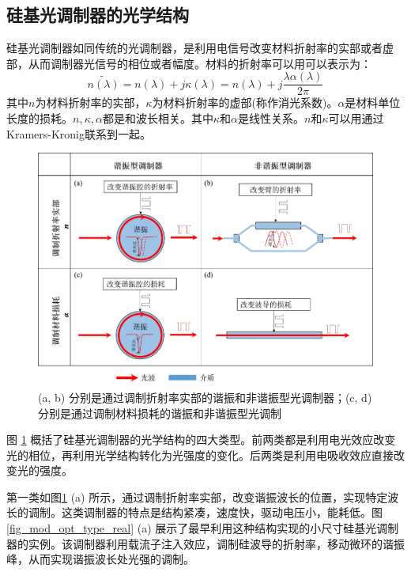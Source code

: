 \subsection{硅基光调制器的光学结构}
硅基光调制器如同传统的光调制器，是利用电信号改变材料折射率的实部或者虚部，从而调制器光信号的相位或者幅度。材料的折射率可以用可以表示为：
\begin{equation}
	\label{Equ:index}
	\widetilde{n(\lambda)} = n(\lambda) + j\kappa(\lambda) =  n(\lambda) + j\frac{\lambda\alpha(\lambda)}{2\pi}
\end{equation}
其中$n$为材料折射率的实部，$\kappa$为材料折射率的虚部(称作消光系数)。$\alpha$是材料单位长度的损耗。$n, \kappa, \alpha$都是和波长相关。其中$\kappa$和$\alpha$是线性关系。$n$和$\kappa$可以用通过Kramers-Kronig联系到一起\cite{o1981kramers}。

\begin{figure}[htb]
	\centering
	\includegraphics[width=12cm]{./Pictures/fig_mod_opt_type.jpg}
	\caption{ (a, b) 分别是通过调制折射率实部的谐振和非谐振型光调制器；(c, d)分别是通过调制材料损耗的谐振和非谐振型光调制}
	\label{fig_mod_opt_type}
\end{figure}
图 \ref{fig_mod_opt_type} 概括了硅基光调制器的光学结构的四大类型。前两类都是利用电光效应改变光的相位，再利用光学结构转化为光强度的变化。后两类是利用电吸收效应直接改变光的强度。

第一类如图\ref{fig_mod_opt_type} (a) 所示，通过调制折射率实部，改变谐振波长的位置，实现特定波长的调制。这类调制器的特点是结构紧凑，速度快，驱动电压小，能耗低。图\ref{fig_mod_opt_type_real} (a) 展示了最早利用这种结构实现的小尺寸硅基光调制器的实例\cite{xu2005micrometre}。该调制器利用载流子注入效应，调制硅波导的折射率，移动微环的谐振峰，从而实现谐振波长处光强的调制。

